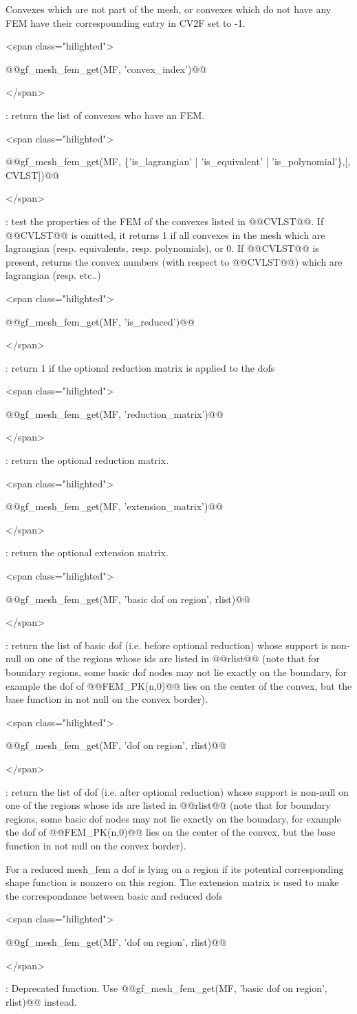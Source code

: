 \documentclass[11pt,a4paper]{article}
\newcommand{\hil}[1]{\begin{rawxml}<span class="hilighted">\end{rawxml}#1\begin{rawxml}</span>\end{rawxml}}
\newcommand{\sep}[1]{\medskip\par\hil{#1}}
\newcommand{\hil}[1]{\colorbox{sepbg}{#1}}
\newcommand{\sep}[1]{\medskip\par#1}
\begin{document}
\begin{cmddescription}
  Convexes which are not part of the mesh, or convexes which do not
  have any FEM have their correspounding entry in CV2F set to -1.

  \sep{@@gf\_mesh\_fem\_get(MF, 'convex\_index')@@} : 
  return the list of convexes who have an FEM.

  \sep{@@gf\_mesh\_fem\_get(MF, \{'is\_lagrangian' | 'is\_equivalent' |
    'is\_polynomial'\},[, CVLST])@@} :
   test
  the properties of the FEM of the convexes listed in @@CVLST@@.  If
  @@CVLST@@ is omitted, it returns 1 if all convexes in the mesh which
  are lagrangian (resp.  equivalents, resp. polynomials), or 0.  If
  @@CVLST@@ is present, returns the convex numbers (with respect to
  @@CVLST@@) which are lagrangian (resp. etc..)

  \sep{@@gf\_mesh\_fem\_get(MF, 'is\_reduced')@@} : 
  return 1 if the optional reduction matrix is applied to the dofs

  \sep{@@gf\_mesh\_fem\_get(MF, 'reduction\_matrix')@@} : 
  return the optional reduction matrix.

  \sep{@@gf\_mesh\_fem\_get(MF, 'extension\_matrix')@@} : 
  return the optional extension matrix.

  \sep{@@gf\_mesh\_fem\_get(MF, 'basic dof on region', rlist)@@} : return the
  list of basic dof (i.e. before optional reduction) whose support is
  non-null on one of the regions whose
  ids are listed in @@rlist@@ (note that for boundary regions, some
  basic dof nodes may not lie exactly on the boundary, for example the dof
  of @@FEM_PK(n,0)@@ lies on the center of the convex, but the base
  function in not null on the convex border).

  \sep{@@gf\_mesh\_fem\_get(MF, 'dof on region', rlist)@@} : return the
  list of dof (i.e. after optional reduction) whose support is
  non-null on one of the regions whose
  ids are listed in @@rlist@@ (note that for boundary regions, some
  basic dof nodes may not lie exactly on the boundary, for example the dof
  of @@FEM_PK(n,0)@@ lies on the center of the convex, but the base
  function in not null on the convex border).
  
  For a reduced mesh\_fem
  a dof is lying on a region if its potential corresponding shape
  function is nonzero on this region. The extension matrix is used
  to make the correspondance between basic and reduced dofs

  \sep{@@gf\_mesh\_fem\_get(MF, 'dof on region', rlist)@@} : Deprecated
  function. Use @@gf\_mesh\_fem\_get(MF, 'basic dof on region', rlist)@@ instead.


\end{cmddescription}
\end{document}
